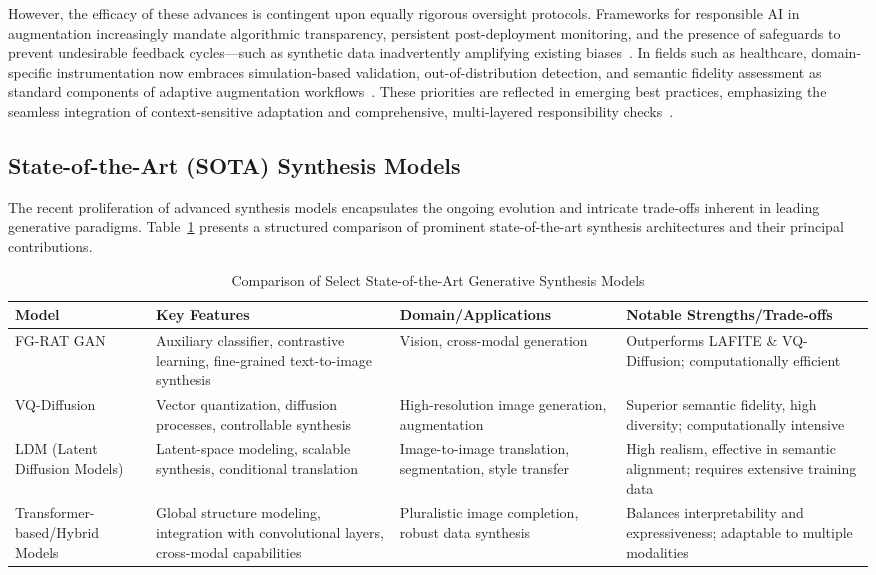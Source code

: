 \documentclass[11pt]{article}
\begin{document}
However, the efficacy of these advances is contingent upon equally rigorous oversight protocols. Frameworks for responsible AI in augmentation increasingly mandate algorithmic transparency, persistent post-deployment monitoring, and the presence of safeguards to prevent undesirable feedback cycles—such as synthetic data inadvertently amplifying existing biases~\cite{ref94,ref95,ref101}. In fields such as healthcare, domain-specific instrumentation now embraces simulation-based validation, out-of-distribution detection, and semantic fidelity assessment as standard components of adaptive augmentation workflows~\cite{ref87,ref101}. These priorities are reflected in emerging best practices, emphasizing the seamless integration of context-sensitive adaptation and comprehensive, multi-layered responsibility checks~\cite{ref94,ref95,ref101}.

\subsection{State-of-the-Art (SOTA) Synthesis Models}

The recent proliferation of advanced synthesis models encapsulates the ongoing evolution and intricate trade-offs inherent in leading generative paradigms. Table~\ref{tab:sota_models} presents a structured comparison of prominent state-of-the-art synthesis architectures and their principal contributions.

\begin{table}[h]
\centering
\caption{Comparison of Select State-of-the-Art Generative Synthesis Models}
\label{tab:sota_models}
\begin{tabular}{|p{3.1cm}|p{4.5cm}|p{3.5cm}|p{3.5cm}|}
\hline
\textbf{Model} & \textbf{Key Features} & \textbf{Domain/Applications} & \textbf{Notable Strengths/Trade-offs} \\
\hline
FG-RAT GAN~\cite{ref87} & Auxiliary classifier, contrastive learning, fine-grained text-to-image synthesis & Vision, cross-modal generation & Outperforms LAFITE \& VQ-Diffusion; computationally efficient \\
\hline
VQ-Diffusion~\cite{ref82,ref87} & Vector quantization, diffusion processes, controllable synthesis & High-resolution image generation, augmentation & Superior semantic fidelity, high diversity; computationally intensive \\
\hline
LDM (Latent Diffusion Models)~\cite{ref82,ref101} & Latent-space modeling, scalable synthesis, conditional translation & Image-to-image translation, segmentation, style transfer & High realism, effective in semantic alignment; requires extensive training data \\
\hline
Transformer-based/Hybrid Models~\cite{ref64,ref81,ref102} & Global structure modeling, integration with convolutional layers, cross-modal capabilities & Pluralistic image completion, robust data synthesis & Balances interpretability and expressiveness; adaptable to multiple modalities \\
\hline
\end{tabular}
\end{table}
\end{document}
